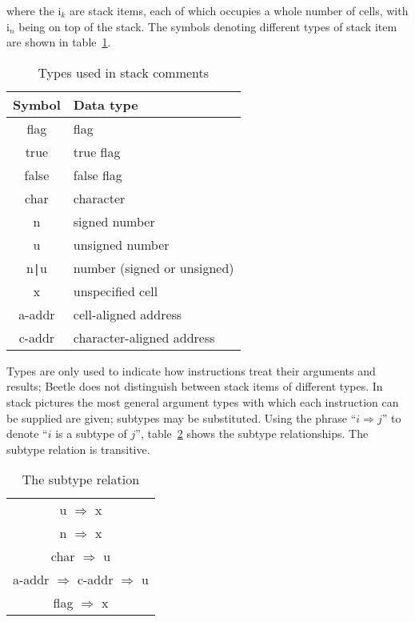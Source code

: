 \documentclass{article}
\newcommand{\spic}[1]{{\spfont\setlength{\baselineskip}{\normalbaselineskip}#1\/}}
\begin{document}
where the \spic{i$_k$} are stack items, each of which occupies a whole number of
cells, with \spic{i$_n$} being on top of the stack. The symbols denoting
different types of stack item are shown in table~\ref{typetable}.

\begin{table}[htbp]
\begin{center}
\begin{tabular}{cl} \toprule
\bf Symbol & \bf Data type \\ \midrule
\spic{flag} & flag \\
\spic{true} & true flag \\
\spic{false} & false flag \\
\spic{char} & character \\
\spic{n} & signed number \\
\spic{u} & unsigned number \\
\spic{n{\tt |}u} & number (signed or unsigned) \\
\spic{x} & unspecified cell \\
\spic{a-addr} & cell-aligned address \\
\spic{c-addr} & character-aligned address \\ \bottomrule
\end{tabular}
\caption{\label{typetable}Types used in stack comments}
\end{center}
\end{table}

Types are only used to indicate how instructions treat their arguments and
results; Beetle does not distinguish between stack items of different types. In
stack pictures the most general argument types with which each instruction can
be supplied are given; subtypes may be substituted. Using the phrase ``$i
\Rightarrow j$'' to denote ``$i$\/ is a subtype of $j$\/'', table~\ref{reltable}
shows the subtype relationships. The subtype relation is transitive.

\begin{table}[htbp]
\begin{center}
\begin{tabular}{c} \toprule
\spic{u} $\Rightarrow$ \spic{x} \\
\spic{n} $\Rightarrow$ \spic{x} \\
\spic{char} $\Rightarrow$ \spic{u} \\
\spic{a-addr} $\Rightarrow$ \spic{c-addr} $\Rightarrow$ \spic{u} \\
\spic{flag} $\Rightarrow$ \spic{x} \\ \bottomrule
\end{tabular}
\caption{\label{reltable}The subtype relation}
\end{center}
\end{table}
\end{document}
